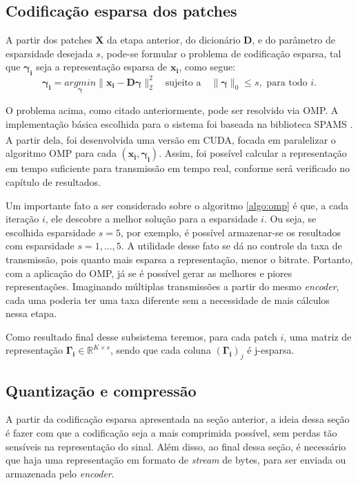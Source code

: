 \documentclass[cic,tc]{iiufrgs}
\renewcommand{\vec}[1]{\bm{#1}}
\newcommand{\mat}[1]{\bm{#1}}
\newcommand{\reg}{\textsuperscript{\textregistered}}
\begin{document}
\subsection{Codificação esparsa dos patches}
A partir dos patches $\mat{X}$ da etapa anterior, do dicionário $\mat{D}$, e do parâmetro 
de esparsidade desejada $s$, pode-se formular o problema de codificação esparsa, tal que 
$\vec{\gamma_i}$ seja a representação esparsa de $\vec{x_i}$, como segue:
\begin{equation}
    \vec{\gamma_i} = \underset{\vec{\gamma}}{argmin} \lVert \vec{x_i} - \mat{D}\vec{\gamma} \rVert_2^2
    \hspace{1em} \text{sujeito a} \hspace{1em}
    \lVert \vec{\gamma} \rVert_0 \le s,
    \text{ para todo } i.
\end{equation}

O problema acima, como citado anteriormente, pode ser resolvido via OMP.
A implementação básica escolhida para o sistema foi baseada na biblioteca SPAMS \cite{SPAMS}.
A partir dela, foi desenvolvida uma versão em CUDA\reg, focada em paralelizar o algoritmo
OMP para cada $(\vec{x_i}, \vec{\gamma_i})$. Assim, foi possível calcular a representação
em tempo suficiente para transmissão em tempo real, conforme será verificado no capítulo 
de resultados.

Um importante fato a ser considerado sobre o algoritmo \autoref{algo:omp} é que, a cada iteração $i$,
ele descobre a melhor solução para a esparsidade $i$. Ou seja, se escolhida esparsidade $s=5$,
por exemplo, é possível armazenar-se os resultados com esparsidade $s=1,...,5$. 
A utilidade desse fato se dá no controle da taxa de transmissão, pois quanto mais esparsa a 
representação, menor o bitrate. 
Portanto, com a aplicação do OMP, já se é possível gerar as melhores e piores representações.
Imaginando múltiplas transmissões a partir do mesmo \textit{encoder}, cada uma poderia ter 
uma taxa diferente sem a necessidade de mais cálculos nessa etapa.

Como resultado final desse subsistema teremos, para cada patch $i$, uma matriz de representação
$\mat{\Gamma_i} \in \mathbb{R}^{K \times s}$, sendo que cada coluna $(\mat{\Gamma_i})_j$ é 
j-esparsa.

\subsection{Quantização e compressão}
A partir da codificação esparsa apresentada na seção anterior, a ideia dessa seção é 
fazer com que a codificação seja a mais comprimida possível, sem perdas tão sensíveis
na representação do sinal.
Além disso, ao final dessa seção, é necessário que haja uma representação em formato de 
\textit{stream} de bytes, para ser enviada ou armazenada pelo \textit{encoder}.
\end{document}

